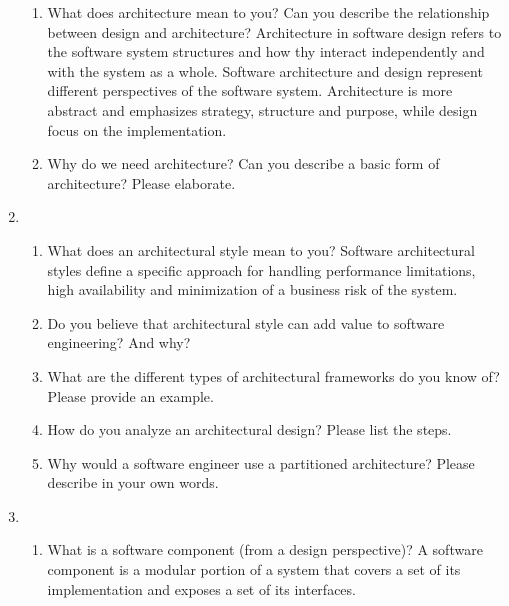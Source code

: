 \documentclass[12pt]{article}
\begin{document}
\begin{enumerate}
\begin{enumerate}[start=1,align=left]
      \item What does architecture mean to you? Can you describe the relationship between design and architecture?
      Architecture in software design refers to the software system structures and how thy interact independently and with the system as a whole. Software architecture and design represent different perspectives of the software system. Architecture is more abstract and emphasizes strategy, structure and purpose, while design focus on the implementation.

      \item Why do we need architecture? Can you describe a basic form of architecture? Please elaborate.
    \end{enumerate}

    \item
    \begin{enumerate}[start=1,align=left]
      \item What does an architectural style mean to you? 
      Software architectural styles define a specific approach for handling performance limitations, high availability and minimization of a business risk of the system.

      \item Do you believe that architectural style can add value to software engineering? And why?


      \item What are the different types of architectural frameworks do you know of? Please provide an example.

      \item How do you analyze an architectural design? Please list the steps.

      \item Why would a software engineer use a partitioned architecture? Please describe in your own words.
    \end{enumerate}

    \item
    \begin{enumerate}[start=1,align=left]
      \item What is a software component (from a design perspective)?
      A software component is a modular portion of a system that covers a set of its implementation and exposes a set of its interfaces.


\end{enumerate}
\end{enumerate}
\end{document}
